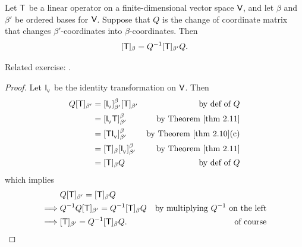 \begin{theorem} \label{thm 2.23}
Let \(\textsf{T}\) be a linear operator on a finite-dimensional vector space \(\textsf{V}\),
and let \(\beta\) and \(\beta'\) be ordered bases for \(\textsf{V}\).
Suppose that \(Q\) is the change of coordinate matrix that changes \(\beta'\)-coordinates into \(\beta\)-coordinates.
Then
\[
    [\textsf{T}]_{\beta} = Q^{-1} [\textsf{T}]_{\beta'} Q.
\]
\end{theorem}

\begin{note}
Related exercise: .
\end{note}

\begin{proof}
Let \(\textsf{I}_{_{\textsf{V}}}\) be the identity transformation on \(\textsf{V}\).
Then
\begin{align*}
    Q [\T]_{\beta'} & = [\ITRANV]_{\beta'}^{\beta} [\T]_{\beta'} & \text{by def of \(Q\)} \\
                    & = [\ITRANV \T]_{\beta'}^{\beta} & \text{by \THM{2.11}} \\
                    & = [\T \ITRANV]_{\beta'}^{\beta} & \text{by \THM{2.10}(c)} \\
                    & = [\T]_{\beta} [\ITRANV]_{\beta'}^{\beta} & \text{by \THM{2.11}} \\
                    & = [\T]_{\beta} Q & \text{by def of \(Q\)}
\end{align*}
which implies
\begin{align*}
             & Q [\textsf{T}]_{\beta'} = [\textsf{T}]_{\beta} Q \\
    \implies & Q^{-1} Q [\textsf{T}]_{\beta'} = Q^{-1} [\textsf{T}]_{\beta} Q & \text{by multiplying \(Q^{-1}\) on the left} \\
    \implies & [\textsf{T}]_{\beta'} = Q^{-1} [\textsf{T}]_{\beta} Q. & \text{of course}
\end{align*}
\end{proof}

